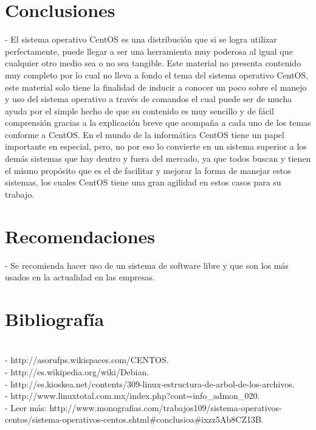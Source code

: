 
\section{Conclusiones} 
	\item - El sistema operativo CentOS es una distribución que si se logra utilizar perfectamente, puede llegar a ser una herramienta muy poderosa al igual que cualquier otro medio sea o no sea tangible. Este material no presenta contenido muy completo por lo cual no lleva a fondo el tema del sistema operativo CentOS, este material solo tiene la finalidad de inducir a conocer un poco sobre el manejo y uso del sistema operativo a través de comandos el cual puede ser de mucha ayuda por el simple hecho de que su contenido es muy sencillo y de fácil comprensión gracias a la explicación breve que acompaña a cada uno de los temas conforme a CentOS. En el mundo de la informática CentOS tiene un papel importante en especial, pero, no por eso lo convierte en un sistema superior a los demás sistemas que hay dentro y fuera del mercado, ya que todos buscan y tienen el mismo propósito que es el de facilitar y mejorar la forma de manejar estos sistemas, los cuales CentOS tiene una gran agilidad en estos casos para su trabajo.
\\

\section{Recomendaciones} 
	\item - Se recomienda hacer uso de un sistema de software libre  y que son los más usados en la actualidad en las empresas.
\\

\section{Bibliografía} 
\begin{itemize}
\\- http://asorufps.wikispaces.com/CENTOS.
\\- http://es.wikipedia.org/wiki/Debian.
\\- http://es.kioskea.net/contents/309-linux-estructura-de-arbol-de-los-archivos.
\\- http://www.linuxtotal.com.mx/index.php?cont=info_admon_020.
\\- Leer más: http://www.monografias.com/trabajos109/sistema-operativos-centos/sistema-operativos-centos.shtml#conclusioa#ixzz5Ab8CZ13B.

\end{itemize} 
